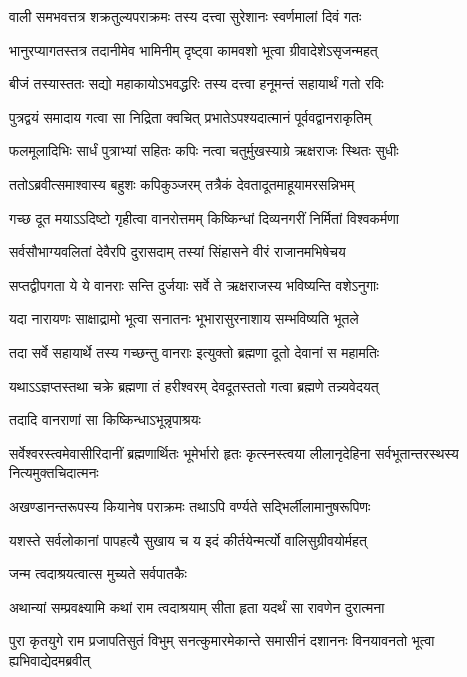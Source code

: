 \twolineshloka
{वाली समभवत्तत्र शक्रतुल्यपराक्रमः}
{तस्य दत्त्वा सुरेशानः स्वर्णमालां दिवं गतः} %

\twolineshloka
{भानुरप्यागतस्तत्र तदानीमेव भामिनीम्}
{दृष्ट्वा कामवशो भूत्वा ग्रीवादेशेऽसृजन्महत्} %

\twolineshloka
{बीजं तस्यास्ततः सद्यो महाकायोऽभवद्धरिः}
{तस्य दत्त्वा हनूमन्तं सहायार्थं गतो रविः} %

\twolineshloka
{पुत्रद्वयं समादाय गत्वा सा निद्रिता क्वचित्}
{प्रभातेऽपश्यदात्मानं पूर्ववद्वानराकृतिम्} %

\twolineshloka
{फलमूलादिभिः सार्धं पुत्राभ्यां सहितः कपिः}
{नत्वा चतुर्मुखस्याग्रे ऋक्षराजः स्थितः सुधीः} %

\twolineshloka
{ततोऽब्रवीत्समाश्वास्य बहुशः कपिकुञ्जरम्}
{तत्रैकं देवतादूतमाहूयामरसन्निभम्} %

\twolineshloka
{गच्छ दूत मयाऽऽदिष्टो गृहीत्वा वानरोत्तमम्}
{किष्किन्धां दिव्यनगरीं निर्मितां विश्वकर्मणा} %

\twolineshloka
{सर्वसौभाग्यवलितां देवैरपि दुरासदाम्}
{तस्यां सिंहासने वीरं राजानमभिषेचय} %

\twolineshloka
{सप्तद्वीपगता ये ये वानराः सन्ति दुर्जयाः}
{सर्वे ते ऋक्षराजस्य भविष्यन्ति वशेऽनुगाः} %

\twolineshloka
{यदा नारायणः साक्षाद्रामो भूत्वा सनातनः}
{भूभारासुरनाशाय सम्भविष्यति भूतले} %

\twolineshloka
{तदा सर्वे सहायार्थे तस्य गच्छन्तु वानराः}
{इत्युक्तो ब्रह्मणा दूतो देवानां स महामतिः} %

\twolineshloka
{यथाऽऽज्ञप्तस्तथा चक्रे ब्रह्मणा तं हरीश्वरम्}
{देवदूतस्ततो गत्वा ब्रह्मणे तन्न्यवेदयत्} %

\onelineshloka
{तदादि वानराणां सा किष्किन्धाऽभून्नृपाश्रयः} %

\threelineshloka
{सर्वेश्वरस्त्वमेवासीरिदानीं ब्रह्मणार्थितः}
{भूमेर्भारो हृतः कृत्स्नस्त्वया लीलानृदेहिना}
{सर्वभूतान्तरस्थस्य नित्यमुक्तचिदात्मनः} %

\twolineshloka
{अखण्डानन्तरूपस्य कियानेष पराक्रमः}
{तथाऽपि वर्ण्यते सद्भिर्लीलामानुषरूपिणः} %

\twolineshloka
{यशस्ते सर्वलोकानां पापहत्यै सुखाय च}
{य इदं कीर्तयेन्मर्त्यो वालिसुग्रीवयोर्महत्} %

\onelineshloka
{जन्म त्वदाश्रयत्वात्स मुच्यते सर्वपातकैः} %

\twolineshloka
{अथान्यां सम्प्रवक्ष्यामि कथां राम त्वदाश्रयाम्}
{सीता हृता यदर्थं सा रावणेन दुरात्मना} %

\threelineshloka
{पुरा कृतयुगे राम प्रजापतिसुतं विभुम्}
{सनत्कुमारमेकान्ते समासीनं दशाननः}
{विनयावनतो भूत्वा ह्यभिवाद्येदमब्रवीत्} %

